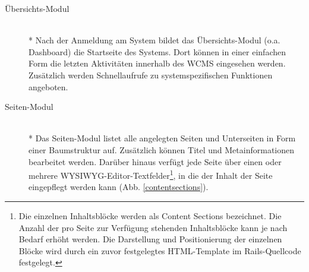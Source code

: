 \begin{description}
\item[Übersichts-Modul]\mbox{~}\\*
Nach der Anmeldung am System bildet das Übersichts-Modul (o.a. Dashboard) die Startseite des Systems. Dort können in einer einfachen Form die letzten Aktivitäten innerhalb des WCMS eingesehen werden. Zusätzlich werden Schnellaufrufe zu systemspezifischen Funktionen angeboten.
\item[Seiten-Modul]\mbox{~}\\*
Das Seiten-Modul listet alle angelegten Seiten und Unterseiten in Form einer Baumstruktur auf. Zusätzlich können Titel und Metainformationen bearbeitet werden. Darüber hinaus verfügt jede Seite über einen oder mehrere WYSIWYG-Editor-Textfelder\footnote{Die einzelnen Inhaltsblöcke werden als Content Sections bezeichnet. Die Anzahl der pro Seite zur Verfügung stehenden Inhaltsblöcke kann je nach Bedarf erhöht werden. Die Darstellung  und Positionierung der einzelnen Blöcke wird durch ein zuvor festgelegtes HTML-Template im Rails-Quellcode festgelegt.}, in die der Inhalt der Seite eingepflegt werden kann (Abb. \ref{contentsections}).


\end{description}
